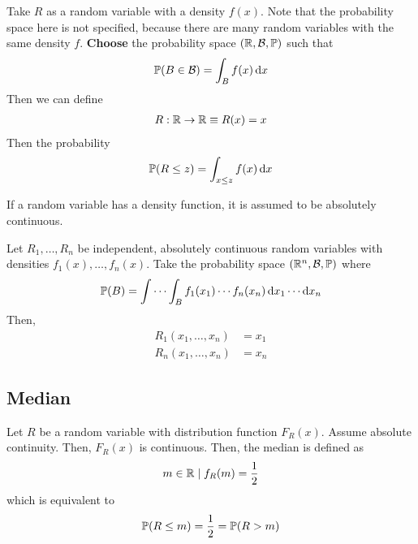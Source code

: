 \noindent Take $R$ as a random variable with a density $f(x)$. Note that the probability space here is not specified, because there are many random variables with the same density $f$. \textbf{Choose} the probability space $(\mathbb{R}, \mathcal{B}, \mathbb{P})$ such that
\begin{align}
    \mathbb{P}(B \in \mathcal{B}) = \int_B f(x) \dd{x}
\end{align}
Then we can define
\begin{align}
    R: \mathbb{R} \to \mathbb{R} \equiv R(x) = x
\end{align}
Then the probability
\begin{align}
    \mathbb{P}(R \le z) = \int_{x \le z} f(x) \dd{x}
\end{align}

\begin{aside}
    If a random variable has a density function, it is assumed to be absolutely continuous.
\end{aside}

Let $R_1, \ldots, R_n$ be independent, absolutely continuous random variables with densities $f_1(x), \ldots, f_n(x)$. Take the probability space $(\mathbb{R}^n, \mathcal{B}, \mathbb{P})$ where
\begin{align}
    \mathbb{P}(B) = \int\cdots\int_B f_1(x_1)\cdots f_n(x_n) \dd{x_1}\cdots\dd{x_n}
\end{align}
Then,
\begin{align}
    R_1(x_1, \ldots, x_n) &= x_1\\
    R_n(x_1, \ldots, x_n) &= x_n
\end{align}

\subsection{Median}
\begin{definition}
    Let $R$ be a random variable with distribution function $F_R(x)$. Assume absolute continuity. Then, $F_R(x)$ is continuous. Then, the median is defined as
    \begin{align}
        m \in \mathbb{R} \mid f_R(m) = \frac{1}{2}
    \end{align}
    which is equivalent to
    \begin{align}
        \mathbb{P}(R \le m) = \frac{1}{2} = \mathbb{P}(R > m)
    \end{align}
\end{definition}

